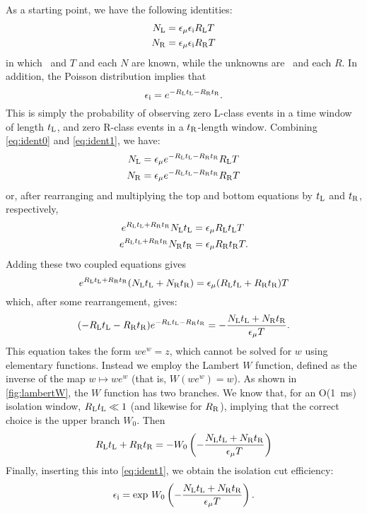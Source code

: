 \documentclass[../thesis.tex]{subfiles}
\begin{document}
As a starting point, we have the following identities:
\begin{align}
  \label{eq:ident0}
  \begin{split}
    N_{\mathrm{L}} &= \epsilon_\mathrm{\mu} \epsilon_\mathrm{i} R_{\mathrm{L}} T \\
    N_{\mathrm{R}} &= \epsilon_\mathrm{\mu} \epsilon_\mathrm{i} R_{\mathrm{R}} T
  \end{split}
\end{align}
in which \emu\ and $T$ and each $N$ are known, while the unknowns are \eisol\ and each $R$. In addition, the Poisson distribution implies that
\begin{equation}
  \label{eq:ident1}
  \epsilon_\mathrm{i} = e^{-R_{\mathrm{L}} t_{\mathrm{L}} -R_{\mathrm{R}} t_{\mathrm{R}}}.
\end{equation}
This is simply the probability of observing zero L-class events in a time window of length $t_{\mathrm{L}}$, and zero R-class events in a $t_{\mathrm{R}}$-length window. Combining \autoref{eq:ident0} and \autoref{eq:ident1}, we have:
\begin{align*}
  \begin{split}
    N_{\mathrm{L}} &= \epsilon_\mathrm{\mu} e^{-R_{\mathrm{L}} t_{\mathrm{L}} -R_{\mathrm{R}} t_{\mathrm{R}}} R_{\mathrm{L}} T \\
    N_{\mathrm{R}} &= \epsilon_\mathrm{\mu} e^{-R_{\mathrm{L}} t_{\mathrm{L}} -R_{\mathrm{R}} t_{\mathrm{R}}} R_{\mathrm{R}} T \\
\end{split}
\end{align*}
or, after rearranging and multiplying the top and bottom equations by $t_{\mathrm{L}}$ and $t_{\mathrm{R}}$, respectively,
\begin{align*}
  \begin{split}
    e^{R_{\mathrm{L}} t_{\mathrm{L}} + R_{\mathrm{R}} t_{\mathrm{R}}} N_{\mathrm{L}} t_{\mathrm{L}} &= \epsilon_\mathrm{\mu} R_{\mathrm{L}} t_{\mathrm{L}} T \\
    e^{R_{\mathrm{L}} t_{\mathrm{L}} + R_{\mathrm{R}} t_{\mathrm{R}}} N_{\mathrm{R}} t_{\mathrm{R}} &= \epsilon_\mathrm{\mu} R_{\mathrm{R}} t_{\mathrm{R}} T. \\
  \end{split}
\end{align*}
Adding these two coupled equations gives
\begin{equation}
  e^{R_{\mathrm{L}} t_{\mathrm{L}} + R_{\mathrm{R}} t_{\mathrm{R}}} (N_{\mathrm{L}} t_{\mathrm{L}} + N_{\mathrm{R}} t_{\mathrm{R}}) = \epsilon_\mathrm{\mu} (R_{\mathrm{L}} t_{\mathrm{L}} + R_{\mathrm{R}} t_{\mathrm{R}}) T
\end{equation}
which, after some rearrangement, gives:
\begin{equation}
  (-R_{\mathrm{L}} t_{\mathrm{L}} - R_{\mathrm{R}} t_{\mathrm{R}}) e^{-R_{\mathrm{L}} t_{\mathrm{L}} - R_{\mathrm{R}} t_{\mathrm{R}}} = -\frac{N_{\mathrm{L}} t_{\mathrm{L}} + N_{\mathrm{R}} t_{\mathrm{R}}}{\epsilon_\mathrm{\mu} T}.
\end{equation}
This equation takes the form $we^w = z$, which cannot be solved for $w$  using elementary functions. Instead we employ the Lambert $W$ function, defined as the inverse of the map $w \mapsto we^w$ (that is, $W(we^w) = w$). As shown in \autoref{fig:lambertW}, the $W$ function has two branches. We know that, for an O(1~ms) isolation window, $R_{\mathrm{L}} t_{\mathrm{L}} \ll 1$ (and likewise for $R_{\mathrm{R}}$), implying that the correct choice is the upper branch $W_0$. Then
\begin{equation}
  R_{\mathrm{L}} t_{\mathrm{L}} + R_{\mathrm{R}} t_{\mathrm{R}} = - W_0\left(-\frac{N_{\mathrm{L}} t_{\mathrm{L}} + N_{\mathrm{R}} t_{\mathrm{R}}}{\epsilon_\mathrm{\mu} T}\right)
\end{equation}
Finally, inserting this into \autoref{eq:ident1}, we obtain the isolation cut
efficiency:
\begin{equation}
  \label{eq:accIsolEff}
  \epsilon_\mathrm{i} = \exp \, W_0 \left( -\frac{N_{\mathrm{L}} t_{\mathrm{L}} + N_{\mathrm{R}} t_{\mathrm{R}}}{\epsilon_\mathrm{\mu} T} \right).
\end{equation}
\end{document}
